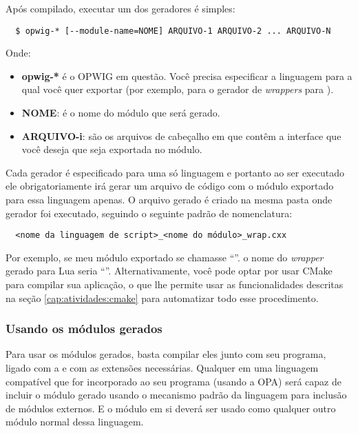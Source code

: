 Após compilado, executar um dos geradores é simples:
\begin{verbatim}
  $ opwig-* [--module-name=NOME] ARQUIVO-1 ARQUIVO-2 ... ARQUIVO-N
\end{verbatim}

Onde:
\begin{itemize}
  \item \textbf{opwig-*} é o OPWIG em questão. Você precisa especificar a
        linguagem para a qual você quer exportar (por exemplo, 
        para o gerador de \textit{wrappers} para ).
  \item \textbf{NOME}: é o nome do módulo que será gerado.
  \item \textbf{ARQUIVO-i}: são os arquivos de cabeçalho em \CXX{} que contêm a interface
        que você deseja que seja exportada no módulo.
\end{itemize}

Cada gerador é especificado para uma só linguagem e portanto ao ser executado
ele obrigatoriamente irá gerar um arquivo de código com o módulo exportado para
essa linguagem apenas. O arquivo gerado é criado na mesma pasta onde gerador foi
executado, seguindo o seguinte padrão de nomenclatura:
\begin{verbatim}
  <nome da linguagem de script>_<nome do módulo>_wrap.cxx
\end{verbatim}

Por exemplo, se meu módulo exportado se chamasse ``''. o nome
do \textit{wrapper} gerado para Lua seria ``''.
Alternativamente, você pode optar por usar CMake para compilar sua aplicação, o que
lhe permite usar as funcionalidades descritas na seção \ref{cap:atividades:cmake}
para automatizar todo esse procedimento.

\subsubsection{Usando os módulos gerados}

Para usar os módulos gerados, basta compilar eles junto com seu programa, ligado com
a  e com as extensões necessárias. Qualquer \script{} em uma
linguagem compatível que for incorporado ao seu programa (usando a OPA) será
capaz de incluir o módulo gerado usando o mecanismo padrão da linguagem para
inclusão de módulos externos. E o módulo em si deverá ser usado como qualquer
outro módulo normal dessa linguagem.

